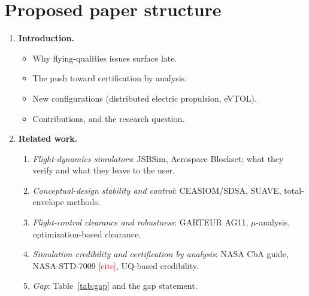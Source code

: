 \documentclass[11pt]{article}
\newcommand{\todo}[1]{\textcolor{red}{[#1]}}
\begin{document}
\section{Proposed paper structure}
\begin{enumerate}[label=\arabic*.,leftmargin=*]
\item \textbf{Introduction.}
  \begin{itemize}
    \item Why flying-qualities issues surface late.
    \item The push toward certification by analysis.
    \item New configurations (distributed electric propulsion, eVTOL).
    \item Contributions, and the research question.
  \end{itemize}

\item \textbf{Related work.}
  \begin{enumerate}[label*=\arabic*.]
    \item \emph{Flight-dynamics simulators}: JSBSim, Aerospace Blockset;
      what they verify and what they leave to the user.
    \item \emph{Conceptual-design stability and control}: CEASIOM/SDSA,
      SUAVE, total-envelope methods.
    \item \emph{Flight-control clearance and robustness}: GARTEUR AG11,
      $\mu$-analysis, optimization-based clearance.
    \item \emph{Simulation credibility and certification by analysis}:
      NASA CbA guide, NASA-STD-7009 \todo{cite},
      UQ-based credibility.
    \item \emph{Gap}: Table~\ref{tab:gap} and the gap statement.
  \end{enumerate}


\end{enumerate}
\end{document}
